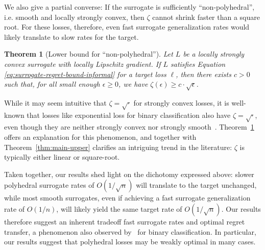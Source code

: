 \documentclass{article}
\newtheorem{theorem}{Theorem}
\theoremstyle{definition}\newtheorem{definition}{Definition}
\theoremstyle{definition}\newtheorem{assumption}{Assumption}
\newcommand{\Comments}{0}
\newcommand{\mynote}[2]{\ifnum\Comments=1\textcolor{#1}{#2}\fi}
\newcommand{\bo}[1]{\mynote{blue}{[Bo: #1]}}
\begin{document}
We also give a partial converse: If the surrogate is sufficiently ``non-polyhedral'', i.e. smooth and locally strongly convex, then $\zeta$ cannot shrink faster than a square root.
For these losses, therefore, even fast surrogate generalization rates would likely translate to slow rates for the target.
\begin{theorem}[Lower bound for ``non-polyhedral'']
  \label{thm:main-lower}
  Let $L$ be a locally strongly convex surrogate with locally Lipschitz gradient.
  If $L$ satisfies Equation \ref{eq:surrogate-regret-bound-informal} for a target loss $\ell$, then there exists $c>0$ such that, for all small enough $\epsilon \geq 0$, we have $\zeta(\epsilon) \geq c\cdot\sqrt{\epsilon}$.
\end{theorem}
While it may seem intuitive that $\zeta=\sqrt{\cdot}$ for strongly convex losses, it is well-known that losses like exponential loss for binary classification also have $\zeta=\sqrt{\cdot}$, even though they are neither strongly convex nor strongly smooth~\cite{bartlett2006convexity}.
Theorem~\ref{thm:main-lower} offers an explanation for this phenomenon, and together with Theorem~\ref{thm:main-upper} clarifies an intriguing trend in the literature: $\zeta$ is typically either linear or square-root.

Taken together, our results shed light on the dichotomy expressed above: slower polyhedral surrogate rates of $O(1/\sqrt{n})$ will translate to the target unchanged, while most smooth surrogates, even if achieving a fast surrogate generalization rate of $O(1/n)$, will likely yield the same target rate of $O(1/\sqrt{n})$.
Our results therefore suggest an inherent tradeoff fast surrogate rates and optimal regret transfer, a phenomenon also observed by~\citet{mahdavi2014binary} for binary classification.
In particular, our results suggest that polyhedral losses may be weakly optimal in many cases.
\end{document}
